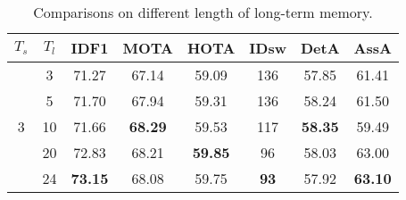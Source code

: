 \begin{table}
\centering
\footnotesize
\begin{tabular}{cc|cccccc}
\toprule[1.5pt]
        \textbf{$T_s$} & \textbf{$T_l$} & \textbf{IDF1} & \textbf{MOTA} & \textbf{HOTA} & \textbf{IDsw} & \textbf{DetA} & \textbf{AssA} \\\hline
        \multirow{5}{*}{3} & 3 & 71.27 & 67.14 & 59.09 & 136 &57.85& 61.41\\
        & 5 & 71.70 & 67.94 & 59.31 & 136 & 58.24 & 61.50\\
        & 10 & 71.66 & \textbf{68.29}& 59.53 & 117 & \textbf{58.35} & 59.49\\
        & 20 & 72.83&  68.21 & \textbf{59.85} & 96& 58.03 & 63.00\\
        & 24 & \textbf{73.15}& 68.08& 59.75 & \textbf{93} & 57.92 & \textbf{63.10}\\
\bottomrule[1.5pt]
    \end{tabular}
\vspace{-2.0mm}
\caption{Comparisons on different length of long-term memory.}
\label{tab:ablation:memory_length_long}
\vspace{-2.0mm}
\end{table}